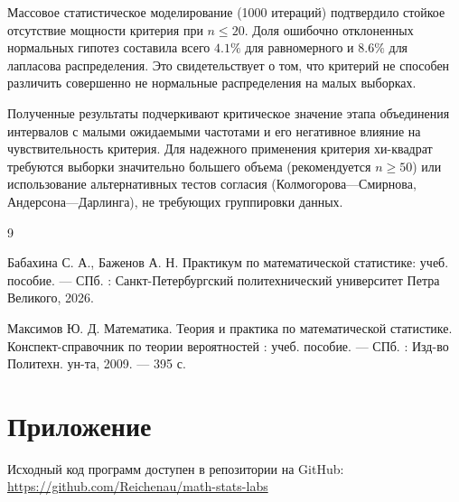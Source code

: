 \documentclass[a4paper, 14pt]{extarticle}
\begin{document}
Массовое статистическое моделирование (1000 итераций) подтвердило стойкое отсутствие мощности критерия при $n \le 20$. Доля ошибочно отклоненных нормальных гипотез составила всего $4.1\%$ для равномерного и $8.6\%$ для лапласова распределения. Это свидетельствует о том, что критерий не способен различить совершенно не нормальные распределения на малых выборках.

Полученные результаты подчеркивают критическое значение этапа объединения интервалов с малыми ожидаемыми частотами и его негативное влияние на чувствительность критерия. Для надежного применения критерия хи-квадрат требуются выборки значительно большего объема (рекомендуется $n \ge 50$) или использование альтернативных тестов согласия (Колмогорова—Смирнова, Андерсона—Дарлинга), не требующих группировки данных.
 
\renewcommand{\refname}{\thesection\ Список литературы}

\begin{thebibliography}{9}

    Бабахина С. А., Баженов А. Н. Практикум по математической статистике: учеб. пособие. — СПб. : Санкт-Петербургский политехнический университет Петра Великого, 2026. 

    Максимов Ю. Д. Математика. Теория и практика по математической статистике. Конспект-справочник по теории вероятностей : учеб. пособие. — СПб. : Изд-во Политехн. ун-та, 2009. — 395 с. 

\end{thebibliography}

\section{Приложение}

Исходный код программ доступен в репозитории на GitHub: \\
\url{https://github.com/Reichenau/math-stats-labs}
 
\end{document}
